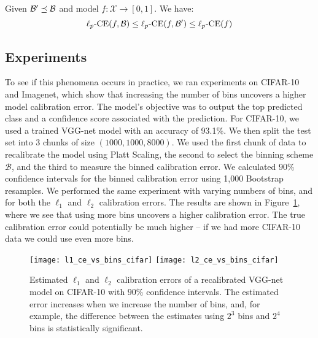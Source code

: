 
\begin{proposition}
Given $\mathcal{B}{}' \preceq \mathcal{B}{}$ and model $f : \mathcal{X} \to [0, 1]$. We have:
\[  \ell_p\mbox{-CE}(f, \mathcal{B}{}) \leq \ell_p\mbox{-CE}(f, \mathcal{B}{}') \leq \ell_p\mbox{-CE}(f) \]
\end{proposition}

\subsection{Experiments}

To see if this phenomena occurs in practice, we ran experiments on CIFAR-10 and Imagenet, which show that increasing the number of bins uncovers a higher model calibration error.
The model's objective was to output the top predicted class and a confidence score associated with the prediction.
For CIFAR-10, we used a trained VGG-net model with an accuracy of 93.1\%.
We then split the test set into 3 chunks of size $(1000, 1000, 8000)$.
We used the first chunk of data to recalibrate the model using Platt Scaling, the second to select the binning scheme $\mathcal{B}$, and the third to measure the binned calibration error.
We calculated $90\%$ confidence intervals for the binned calibration error using 1,000 Bootstrap resamples.
We performed the same experiment with varying numbers of bins, and for both the $\ell_1$ and $\ell_2$ calibration errors.
The results are shown in Figure~\ref{fig:ce_vs_bins}, where we see that using more bins uncovers a higher calibration error. 
The true calibration error could potentially be much higher -- if we had more CIFAR-10 data we could use even more bins.

\begin{figure}
  \centering
  \texttt{[image: l1\_ce\_vs\_bins\_cifar]}
  \texttt{[image: l2\_ce\_vs\_bins\_cifar]}
  \caption{Estimated $\ell_1$ and $\ell_2$ calibration errors of a recalibrated VGG-net model on CIFAR-10 with $90\%$ confidence intervals. The estimated error increases when we increase the number of bins, and, for example, the difference between the estimates using $2^3$ bins and $2^4$ bins is statistically significant.}
  \label{fig:ce_vs_bins}
\end{figure}

